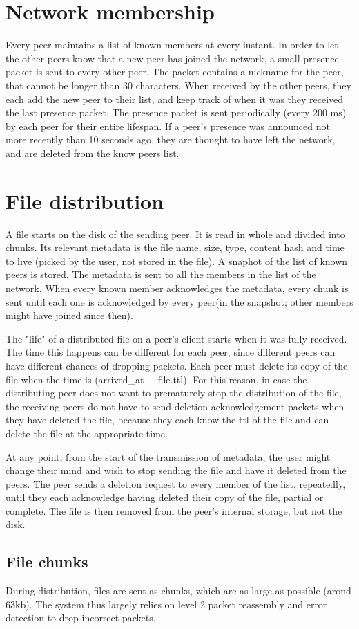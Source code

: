 
\section{Network membership}
Every peer maintains a list of known members at every instant.
In order to let the other peers know that a new peer has joined the network, a small presence packet is sent to every other peer. The packet contains a nickname for the peer, that cannot be longer than 30 characters. When received by the other peers, they each add the new peer to their list, and keep track of when it was they received the last presence packet. The presence packet is sent periodically (every 200 ms) by each peer for their entire lifespan. If a peer's presence was announced not more recently than 10 seconds ago, they are thought to have left the network, and are deleted from the know peers list.

\section{File distribution}
A file starts on the disk of the sending peer. It is read in whole and divided into chunks. Its relevant metadata is the file name, size, type, content hash and time to live (picked by the user, not stored in the file). A snaphot of the list of known peers is stored. The metadata is sent to all the members in the list of the network. When every known member acknowledges the metadata, every chunk is sent until each one is acknowledged by every peer(in the snapshot; other members might have joined since then). 

The "life" of a distributed file on a peer's client starts when it was fully received. The time this happens can be different for each peer, since different peers can have different chances of dropping packets. Each peer must delete its copy of the file when the time is (arrived_at + file.ttl). For this reason, in case the distributing peer does not want to prematurely stop the distribution of the file, the receiving peers do not have to send deletion acknowledgement packets when they have deleted the file, because they each know the ttl of the file and can delete the file at the appropriate time.

At any point, from the start of the transmission of metadata, the user might change their mind and wish to stop sending the file and have it deleted from the peers. The peer sends a deletion request to every member of the list, repeatedly, until they each acknowledge having deleted their copy of the file, partial or complete. The file is then removed from the peer's internal storage, but not the disk.


\subsection{File chunks}
During distribution, files are sent as chunks, which are as large as possible (arond 63kb). The system thus largely relies on level 2 packet reassembly and error detection to drop incorrect packets.
